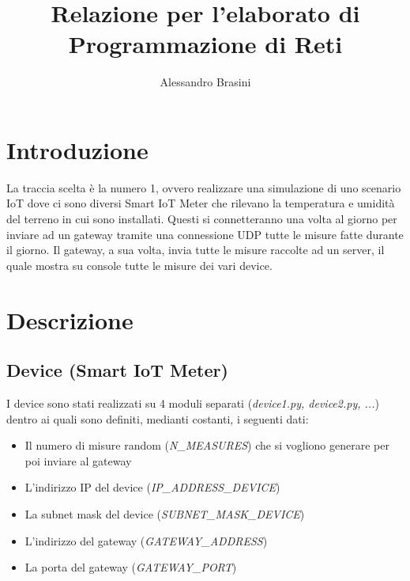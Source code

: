\documentclass[a4paper, 14pt]{extreport}
\title{Relazione per l'elaborato di Programmazione di Reti}
\author{Alessandro Brasini}
\begin{document}
    \maketitle
    \tableofcontents

    \chapter{Introduzione}
    La traccia scelta è la numero 1, ovvero realizzare una simulazione di uno scenario IoT 
    dove ci sono diversi Smart IoT Meter che rilevano la temperatura e umidità del terreno in cui sono installati.
    Questi si connetteranno una volta al giorno per inviare ad un gateway tramite una connessione UDP tutte le
    misure fatte durante il giorno.
    Il gateway, a sua volta, invia tutte le misure raccolte ad un server, il quale mostra su console tutte le misure
    dei vari device.

    \chapter{Descrizione}

    \section{Device (Smart IoT Meter)}
    I device sono stati realizzati su 4 moduli separati (\emph{device1.py, device2.py, ...})
    dentro ai quali sono definiti, medianti costanti, i seguenti dati:
    \begin{itemize}
        \item Il numero di misure random (\emph{N\_MEASURES}) che si vogliono generare per poi inviare al gateway
        \item L'indirizzo IP del device (\emph{IP\_ADDRESS\_DEVICE})
        \item La subnet mask del device (\emph{SUBNET\_MASK\_DEVICE})
        \item L'indirizzo del gateway (\emph{GATEWAY\_ADDRESS})
        \item La porta del gateway (\emph{GATEWAY\_PORT})
    \end{itemize}
\end{document}
